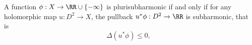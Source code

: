 

    A function $\phi: X\to \RR\cup\{-\infty\}$ is plurisubharmonic if and only if for any holomorphic map $u: D^2\to X$, the pullback $u^*\phi: D^2\to \RR$ is subharmonic, that is 
    \[\Delta (u^*\phi)\leq 0,\]
